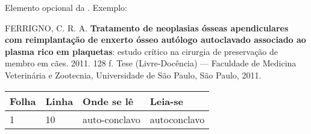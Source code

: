 
\begin{errata}
    Elemento opcional da . Exemplo:

    \vspace{\onelineskip}

    FERRIGNO, C. R. A. \textbf{Tratamento de neoplasias ósseas apendiculares com
        reimplantação de enxerto ósseo autólogo autoclavado associado ao plasma
        rico em plaquetas}: estudo crítico na cirurgia de preservação de membro em
    cães. 2011. 128 f. Tese (Livre-Docência) --- Faculdade de Medicina Veterinária e
    Zootecnia, Universidade de São Paulo, São Paulo, 2011.

    \begin{table}[htb]
        \center%
        \footnotesize
        \begin{tabular}{p{1.4cm}p{1cm}p{3cm}p{3cm}}
            \toprule
            \textbf{Folha} & \textbf{Linha} & \textbf{Onde se lê} & \textbf{Leia-se}
            \\
            \midrule
            1              & 10             & auto-conclavo       & autoconclavo
            \\
            \bottomrule
        \end{tabular}
    \end{table}

\end{errata}


